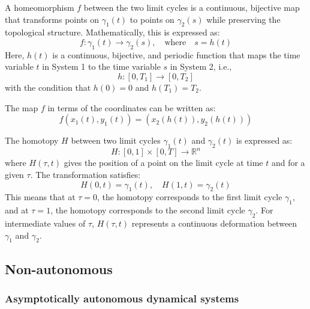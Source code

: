 \documentclass{article}
\theoremstyle{definition}
\theoremstyle{remark}
\newcounter{ct}
\begin{document}
A homeomorphism \( f \) between the two limit cycles is a continuous, bijective map that transforms points on \( \gamma_1(t) \) to points on \( \gamma_2(s) \) while preserving the topological structure. Mathematically, this is expressed as:
\[
f: \gamma_1(t) \rightarrow \gamma_2(s), \quad \text{where} \quad s = h(t)
\]
Here, \( h(t) \) is a continuous, bijective, and periodic function that maps the time variable \( t \) in System 1 to the time variable \( s \) in System 2, i.e.,
\[
h: [0, T_1] \rightarrow [0, T_2]
\]
with the condition that \( h(0) = 0 \) and \( h(T_1) = T_2 \).

The map \( f \) in terms of the coordinates can be written as:
\[
f(x_1(t), y_1(t)) = (x_2(h(t)), y_2(h(t)))
\]



The homotopy \( H \) between two limit cycles \( \gamma_1(t) \) and \( \gamma_2(t) \) is expressed as:
\[
H: [0,1] \times [0, T] \rightarrow \mathbb{R}^n
\]
where \( H(\tau, t) \) gives the position of a point on the limit cycle at time \( t \) and for a given \( \tau \). The transformation satisfies:
\[
H(0, t) = \gamma_1(t), \quad H(1, t) = \gamma_2(t)
\]
This means that at \( \tau = 0 \), the homotopy corresponds to the first limit cycle \( \gamma_1 \), and at \( \tau = 1 \), the homotopy corresponds to the second limit cycle \( \gamma_2 \). For intermediate values of \( \tau \), \( H(\tau, t) \) represents a continuous deformation between \( \gamma_1 \) and \( \gamma_2 \).



\subsection{Non-autonomous}
\subsubsection{Asymptotically autonomous dynamical systems}
\citep{wieczorek2021compactification}
\end{document}

